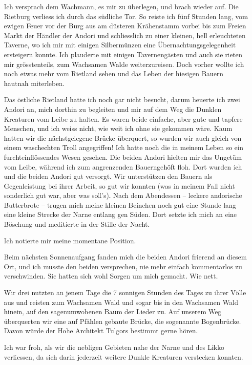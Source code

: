 Ich versprach dem Wachmann, es mir zu überlegen, und brach wieder auf. Die Rietburg verliess ich durch das südliche Tor. So reiste ich fünf Stunden lang, vom ewigen Feuer vor der Burg aus am düsteren Krähenstamm vorbei bis zum Freien Markt der Händler der Andori und schliesslich zu einer kleinen, hell erleuchteten Taverne, wo ich mir mit einigen Silbermünzen eine Übernachtungsgelegenheit ersteigern konnte. Ich plauderte mit einigen Tavernengästen und auch sie rieten mir grösstenteils, zum Wachsamen Walde weiterzureisen. Doch vorher wollte ich noch etwas mehr vom Rietland sehen und das Leben der hiesigen Bauern hautnah miterleben.

Das östliche Rietland hatte ich noch gar nicht besucht, darum heuerte ich zwei Andori an, mich dorthin zu begleiten und mir auf dem Weg die Dunklen Kreaturen vom Leibe zu halten. Es waren beide einfache, aber gute und tapfere Menschen, und ich weiss nicht, wie weit ich ohne sie gekommen wäre. Kaum hatten wir die nächstgelegene Brücke überquert, so wurden wir auch gleich von einem waschechten Troll angegriffen! Ich hatte noch die in meinem Leben so ein furchteinflössendes Wesen gesehen. Die beiden Andori hielten mir das Ungetüm vom Leibe, während ich zum angrenzenden Bauerngehöft floh. Dort wurden ich und die beiden Andori gut versorgt. Wir unterstützen den Bauern als Gegenleistung bei ihrer Arbeit, so gut wir konnten (was in meinem Fall nicht sonderlich gut war, aber was soll’s). Nach dem Abendessen – leckere andorische Butterbrote – trugen mich meine kleinen Beinchen noch gut eine Stunde lang eine kleine Strecke der Narne entlang gen Süden. Dort setzte ich mich an eine Böschung und meditierte in der Stille der Nacht.

Ich notierte mir meine momentane Position.\bigskip



Beim nächsten Sonnenaufgang fanden mich die beiden Andori frierend an diesem Ort, und ich musste den beiden versprechen, nie mehr einfach kommentarlos zu verschwinden. Sie hatten sich wohl Sorgen um mich gemacht. Wie nett.

Wir drei nutzten an jenem Tage die 7 sonnigen Stunden des Tages zu ihrer Völle aus und reisten zum Wachsamen Wald und sogar bis in den Wachsamen Wald hinein, auf den sagenumwobenen Baum der Lieder zu. Auf unserem Weg überquerten wir eine auf Pfählen gebaute Brücke, die sogenannte Bogenbrücke. Davon würde der Hohe Architekt Tulgors bestimmt gerne hören.

Ich war froh, als wir die nebligen Gebieten nahe der Narne und des Likko verliessen, da sich darin jederzeit weitere Dunkle Kreaturen verstecken konnten.

